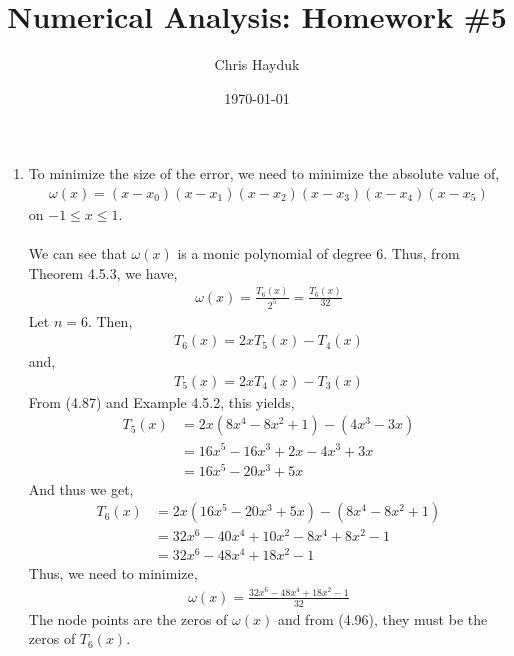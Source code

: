 \documentclass[12pt]{article}
\newenvironment{problem}[2][Problem]{\begin{trivlist}
\item[\hskip \labelsep {\bfseries #1}\hskip \labelsep {\bfseries #2.}]}{\end{trivlist}}
\begin{document}
\title{Numerical Analysis: Homework \#5}

\author{Chris Hayduk}
\date{\today}

\maketitle

\begin{problem}{1}
\end{problem}

\begin{enumerate}
	\item[a)] To minimize the size of the error, we need to minimize the absolute value of,
	\begin{align*}
		\omega(x) = (x - x_0)(x - x_1)(x - x_2)(x - x_3)(x - x_4)(x - x_5)
	\end{align*}
	on $-1 \leq x \leq 1$.\\\\
	We can see that $\omega(x)$ is a monic polynomial of degree 6. Thus, from Theorem 4.5.3, we have,
	\begin{align*}
		\omega(x) = \frac{T_6(x)}{2^5} = \frac{T_6(x)}{32}
	\end{align*}
	Let $n = 6$. Then,
	\begin{align*}
		T_6(x) = 2xT_5(x) - T_4(x)
	\end{align*}
	and,
	\begin{align*}
		T_5(x) = 2xT_4(x) - T_3(x)
	\end{align*}
	From (4.87) and Example 4.5.2, this yields,
	\begin{align*}
		T_5(x) &= 2x(8x^4 - 8x^2 + 1) - (4x^3 - 3x)\\
		&= 16x^5 - 16x^3 + 2x - 4x^3 + 3x\\
		&= 16x^5 - 20x^3 + 5x
	\end{align*}
	And thus we get,
	\begin{align*}
		T_6(x) &= 2x(16x^5 - 20x^3 + 5x) - (8x^4 - 8x^2 + 1)\\
		&= 32x^6 - 40x^4 + 10x^2 - 8x^4 + 8x^2 - 1\\
		&= 32x^6 - 48x^4 + 18x^2 - 1
	\end{align*}
	Thus, we need to minimize,
	\begin{align*}
		\omega(x) = \frac{32x^6 - 48x^4 + 18x^2 - 1}{32}
	\end{align*}
	The node points are the zeros of $\omega(x)$ and from (4.96), they must be the zeros of $T_6(x)$.\\\\

\end{enumerate}
\end{document}
